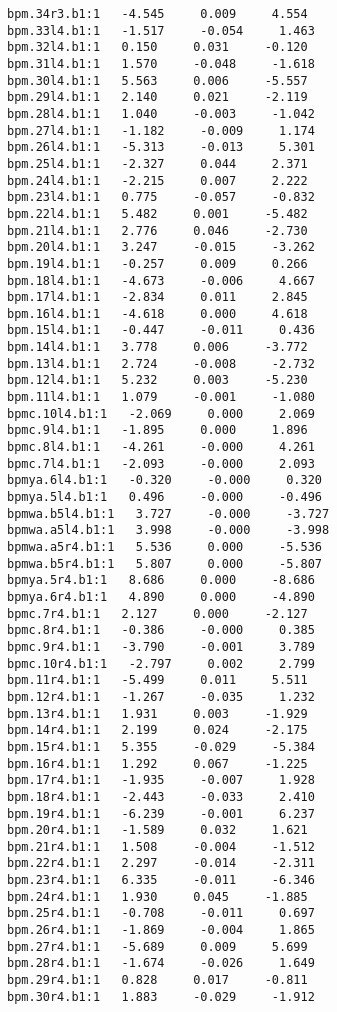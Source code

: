 \begin{verbatim}
bpm.34r3.b1:1   -4.545     0.009     4.554
bpm.33l4.b1:1   -1.517     -0.054     1.463
bpm.32l4.b1:1   0.150     0.031     -0.120
bpm.31l4.b1:1   1.570     -0.048     -1.618
bpm.30l4.b1:1   5.563     0.006     -5.557
bpm.29l4.b1:1   2.140     0.021     -2.119
bpm.28l4.b1:1   1.040     -0.003     -1.042
bpm.27l4.b1:1   -1.182     -0.009     1.174
bpm.26l4.b1:1   -5.313     -0.013     5.301
bpm.25l4.b1:1   -2.327     0.044     2.371
bpm.24l4.b1:1   -2.215     0.007     2.222
bpm.23l4.b1:1   0.775     -0.057     -0.832
bpm.22l4.b1:1   5.482     0.001     -5.482
bpm.21l4.b1:1   2.776     0.046     -2.730
bpm.20l4.b1:1   3.247     -0.015     -3.262
bpm.19l4.b1:1   -0.257     0.009     0.266
bpm.18l4.b1:1   -4.673     -0.006     4.667
bpm.17l4.b1:1   -2.834     0.011     2.845
bpm.16l4.b1:1   -4.618     0.000     4.618
bpm.15l4.b1:1   -0.447     -0.011     0.436
bpm.14l4.b1:1   3.778     0.006     -3.772
bpm.13l4.b1:1   2.724     -0.008     -2.732
bpm.12l4.b1:1   5.232     0.003     -5.230
bpm.11l4.b1:1   1.079     -0.001     -1.080
bpmc.10l4.b1:1   -2.069     0.000     2.069
bpmc.9l4.b1:1   -1.895     0.000     1.896
bpmc.8l4.b1:1   -4.261     -0.000     4.261
bpmc.7l4.b1:1   -2.093     -0.000     2.093
bpmya.6l4.b1:1   -0.320     -0.000     0.320
bpmya.5l4.b1:1   0.496     -0.000     -0.496
bpmwa.b5l4.b1:1   3.727     -0.000     -3.727
bpmwa.a5l4.b1:1   3.998     -0.000     -3.998
bpmwa.a5r4.b1:1   5.536     0.000     -5.536
bpmwa.b5r4.b1:1   5.807     0.000     -5.807
bpmya.5r4.b1:1   8.686     0.000     -8.686
bpmya.6r4.b1:1   4.890     0.000     -4.890
bpmc.7r4.b1:1   2.127     0.000     -2.127
bpmc.8r4.b1:1   -0.386     -0.000     0.385
bpmc.9r4.b1:1   -3.790     -0.001     3.789
bpmc.10r4.b1:1   -2.797     0.002     2.799
bpm.11r4.b1:1   -5.499     0.011     5.511
bpm.12r4.b1:1   -1.267     -0.035     1.232
bpm.13r4.b1:1   1.931     0.003     -1.929
bpm.14r4.b1:1   2.199     0.024     -2.175
bpm.15r4.b1:1   5.355     -0.029     -5.384
bpm.16r4.b1:1   1.292     0.067     -1.225
bpm.17r4.b1:1   -1.935     -0.007     1.928
bpm.18r4.b1:1   -2.443     -0.033     2.410
bpm.19r4.b1:1   -6.239     -0.001     6.237
bpm.20r4.b1:1   -1.589     0.032     1.621
bpm.21r4.b1:1   1.508     -0.004     -1.512
bpm.22r4.b1:1   2.297     -0.014     -2.311
bpm.23r4.b1:1   6.335     -0.011     -6.346
bpm.24r4.b1:1   1.930     0.045     -1.885
bpm.25r4.b1:1   -0.708     -0.011     0.697
bpm.26r4.b1:1   -1.869     -0.004     1.865
bpm.27r4.b1:1   -5.689     0.009     5.699
bpm.28r4.b1:1   -1.674     -0.026     1.649
bpm.29r4.b1:1   0.828     0.017     -0.811
bpm.30r4.b1:1   1.883     -0.029     -1.912

\end{verbatim}
